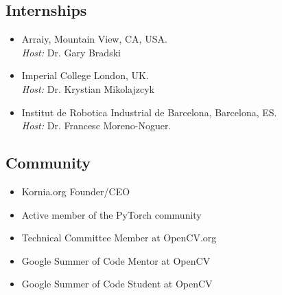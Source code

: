 \subsection{Internships}
\begin{itemize}
\item Arraiy, Mountain View, CA, USA.\\
\textit{Host:} Dr. Gary Bradski
\item Imperial College London, UK.\\
\textit{Host:} Dr. Krystian Mikolajzcyk
\item Institut de Robotica Industrial de Barcelona, Barcelona, ES.\\
\textit{Host:} Dr. Francesc Moreno-Noguer.
\end{itemize}

\subsection{Community}
\begin{itemize}
\item Kornia.org Founder/CEO
\item Active member of the PyTorch community
\item Technical Committee Member at OpenCV.org
\item Google Summer of Code Mentor at OpenCV
\item Google Summer of Code Student at OpenCV
\end{itemize}